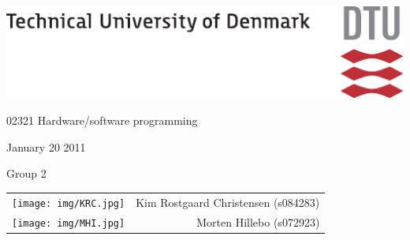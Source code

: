 \documentclass[10pt,english]{article}
\providecommand{\tabularnewline}{\\}
\begin{document}
\begin{flushright}
\textsc{\includegraphics{fig/dtu_A1_UK}}
\par\end{flushright}

\begin{flushright}
\vspace{1in}

\par\end{flushright}

\begin{center}
{\Huge 02321 Hardware/software programming}
\par\end{center}{\Huge \par}



\begin{center}
{\Large January 20 2011}
\par\end{center}{\Large \par}



\begin{center}
Group 2\\

\par\end{center}

\begin{center}
\begin{tabular}{cr}
\texttt{[image: img/KRC.jpg]} & Kim Rostgaard Christensen (s084283)\tabularnewline
\texttt{[image: img/MHI.jpg]} & Morten Hillebo (s072923)\tabularnewline
\end{tabular}
\par\end{center}
\end{document}
